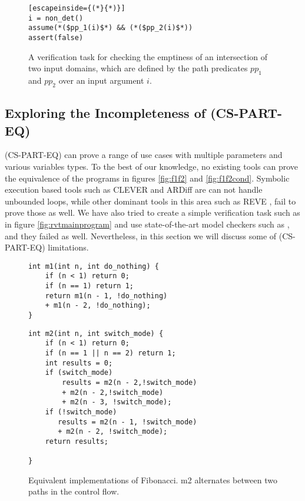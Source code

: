 \begin{figure} [h]
\begin{center}
\begin{minipage}{7 cm}
\begin{lstlisting}[escapeinside={(*}{*)}]
i = non_det()
assume(*($pp_1(i)$*) && (*($pp_2(i)$*))
assert(false)
\end{lstlisting}
\end{minipage}
\caption{A verification task for checking   the emptiness of an intersection of two input domains, which are defined by the path predicates $pp_1$ and $pp_2$ over an input argument $i$.}
\label{fig:checkfeasibility}
\end{center}
\end{figure}

\subsection{Exploring the Incompleteness of (CS-PART-EQ)}
(CS-PART-EQ) can prove a range of use cases with multiple parameters and various variables types. To the best of our knowledge, no existing tools can prove the equivalence of the programs in figures \ref{fig:f1f2} and \ref{fig:f1f2cond}. Symbolic execution based tools such as CLEVER  and ARDiff  are can not handle unbounded loops, while other dominant tools in this area such as REVE , fail to prove those as well. We have also tried to create a simple verification task such as in figure \ref{fig:rvtmainprogram} and use state-of-the-art model checkers such as , and they failed as well. Nevertheless, in this section we will discuss some of (CS-PART-EQ) limitations.
\begin{figure}[h]
\begin{center}
\begin{minipage}{7 cm}
\begin{lstlisting}
int m1(int n, int do_nothing) {
    if (n < 1) return 0;
    if (n == 1) return 1;
    return m1(n - 1, !do_nothing) 
    + m1(n - 2, !do_nothing);
}
\end{lstlisting}
\end{minipage}
\begin{minipage}{7 cm}
\begin{lstlisting}
int m2(int n, int switch_mode) {
    if (n < 1) return 0;
    if (n == 1 || n == 2) return 1;
    int results = 0;
    if (switch_mode)
        results = m2(n - 2,!switch_mode) 
        + m2(n - 2,!switch_mode) 
        + m2(n - 3, !switch_mode);
    if (!switch_mode)
       results = m2(n - 1, !switch_mode) 
       + m2(n - 2, !switch_mode);
    return results;

}
\end{lstlisting}
\end{minipage}
\caption{Equivalent implementations of Fibonacci. m2 alternates between two paths in the control flow.}
\label{fig:f1f2switch}
\end{center}
\end{figure}


